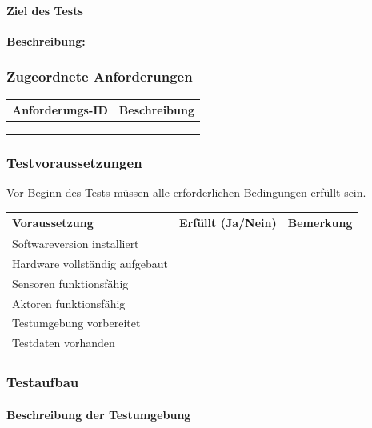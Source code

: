 \documentclass[
  a4paper,
  12pt,
  DIV=12,        %
  parskip=half,  %
  headings=small %
]{scrartcl}
\theoremstyle{definition}
\theoremstyle{definition}
\begin{document}
\paragraph{Ziel des Tests}\label{ziel-des-tests}

\textbf{Beschreibung:}

\subsubsection{Zugeordnete
Anforderungen}\label{zugeordnete-anforderungen-34}

\begin{longtable}[]{@{}ll@{}}
\toprule\noalign{}
Anforderungs-ID & Beschreibung \\
\midrule\noalign{}
\endhead
\bottomrule\noalign{}
\endlastfoot
& \\
& \\
& \\
\end{longtable}

\subsubsection{Testvoraussetzungen}\label{testvoraussetzungen}

Vor Beginn des Tests müssen alle erforderlichen Bedingungen erfüllt
sein.

\begin{longtable}[]{@{}lll@{}}
\toprule\noalign{}
Voraussetzung & Erfüllt (Ja/Nein) & Bemerkung \\
\midrule\noalign{}
\endhead
\bottomrule\noalign{}
\endlastfoot
Softwareversion installiert & & \\
Hardware vollständig aufgebaut & & \\
Sensoren funktionsfähig & & \\
Aktoren funktionsfähig & & \\
Testumgebung vorbereitet & & \\
Testdaten vorhanden & & \\
\end{longtable}

\subsubsection{Testaufbau}\label{testaufbau-9}

\paragraph{Beschreibung der
Testumgebung}\label{beschreibung-der-testumgebung}
\end{document}
